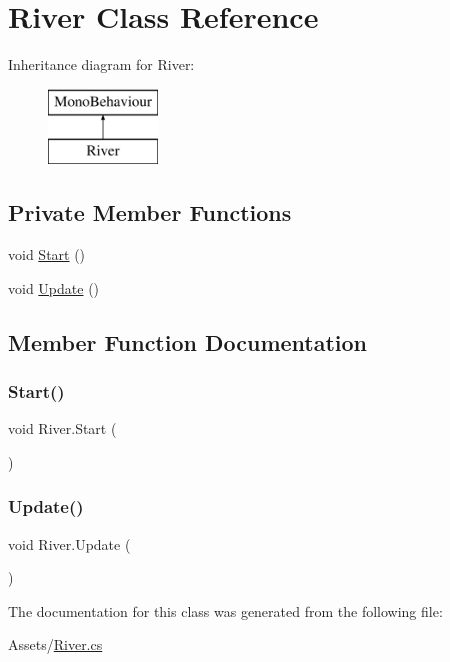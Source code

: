 \hypertarget{class_river}{}\section{River Class Reference}
\label{class_river}
Inheritance diagram for River\+:\begin{figure}[H]
\begin{center}
\leavevmode
\includegraphics[height=2.000000cm]{class_river}
\end{center}
\end{figure}
\subsection*{Private Member Functions}
\begin{DoxyCompactItemize}
\item 
void \hyperlink{class_river_a993c5fb5b5ec86697e2b2416fd538b27}{Start} ()
\item 
void \hyperlink{class_river_ad320cf21a361e0223971150bf96dcaa6}{Update} ()
\end{DoxyCompactItemize}


\subsection{Member Function Documentation}
\mbox{\label{class_river_a993c5fb5b5ec86697e2b2416fd538b27}} 
\subsubsection{\texorpdfstring{Start()}{Start()}}
{\footnotesize\ttfamily void River.\+Start (\begin{DoxyParamCaption}{ }\end{DoxyParamCaption})\hspace{0.3cm}{\ttfamily [private]}}

\mbox{\label{class_river_ad320cf21a361e0223971150bf96dcaa6}} 
\subsubsection{\texorpdfstring{Update()}{Update()}}
{\footnotesize\ttfamily void River.\+Update (\begin{DoxyParamCaption}{ }\end{DoxyParamCaption})\hspace{0.3cm}{\ttfamily [private]}}



The documentation for this class was generated from the following file\+:\begin{DoxyCompactItemize}
\item 
Assets/\hyperlink{_river_8cs}{River.\+cs}\end{DoxyCompactItemize}
